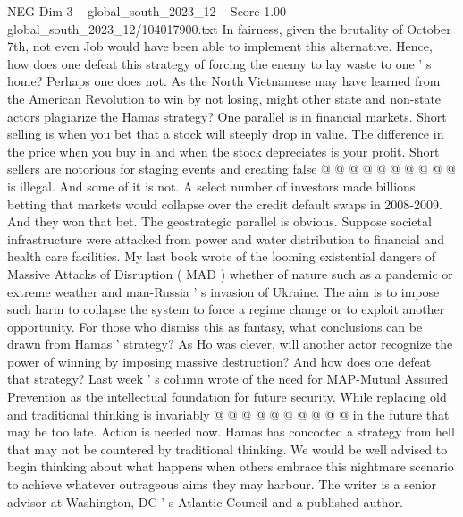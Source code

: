 \begin{textsample}{NEG Dim 3 – global\_south\_2023\_12 – Score 1.00 – global\_south\_2023\_12/104017900.txt}
In fairness, given the brutality of October 7th, not even Job would have been able to implement this alternative.
Hence, how does one defeat this strategy of forcing the enemy to lay waste to one ' s home?
Perhaps one does not.
As the North Vietnamese may have learned from the American Revolution to win by not losing, might other state and non-state actors plagiarize the Hamas strategy?
One parallel is in financial markets.
Short selling is when you bet that a stock will steeply drop in value.
The difference in the price when you buy in and when the stock depreciates is your profit.
Short sellers are notorious for staging events and creating false @ @ @ @ @ @ @ @ @ @ is illegal.
And some of it is not.
A select number of investors made billions betting that markets would collapse over the credit default swaps in 2008-2009.
And they won that bet.
The geostrategic parallel is obvious.
Suppose societal infrastructure were attacked from power and water distribution to financial and health care facilities.
My last book wrote of the looming existential dangers of Massive Attacks of Disruption ( MAD ) whether of nature such as a pandemic or extreme weather and man-Russia ' s invasion of Ukraine.
The aim is to impose such harm to collapse the system to force a regime change or to exploit another opportunity.
For those who dismiss this as fantasy, what conclusions can be drawn from Hamas ' strategy?
As Ho was clever, will another actor recognize the power of winning by imposing massive destruction?
And how does one defeat that strategy?
Last week ' s column wrote of the need for MAP-Mutual Assured Prevention as the intellectual foundation for future security.
While replacing old and traditional thinking is invariably @ @ @ @ @ @ @ @ @ @ in the future that may be too late.
Action is needed now.
Hamas has concocted a strategy from hell that may not be countered by traditional thinking.
We would be well advised to begin thinking about what happens when others embrace this nightmare scenario to achieve whatever outrageous aims they may harbour.
The writer is a senior advisor at Washington, DC ' s Atlantic Council and a published author.

\end{textsample}
